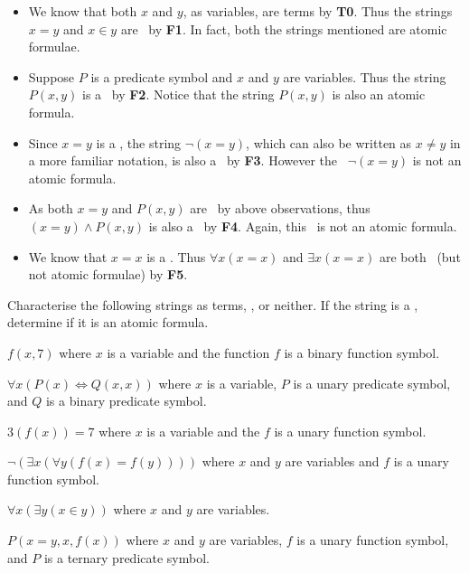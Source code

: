 \begin{example}
    \begin{itemize}[leftmargin=*]
        \item We know that both $x$ and $y$, as variables, are terms by \textbf{T0}. Thus the strings $x=y$ and $x \in y$ are \wffs~by \textbf{F1}. In fact, both the strings mentioned are atomic formulae.
        \item Suppose $P$ is a predicate symbol and $x$ and $y$ are variables. Thus the string $P(x,y)$ is a \wff~by \textbf{F2}. Notice that the string $P(x,y)$ is also an atomic formula.
        \item Since $x=y$ is a \wff, the string $\lnot(x=y)$, which can also be written as $x \neq y$ in a more familiar notation, is also a \wff~by \textbf{F3}. However the \wff~$\lnot(x=y)$ is not an atomic formula.
        \item As both $x=y$ and $P(x,y)$ are \wffs~by above observations, thus $(x=y)\land P(x,y)$ is also a \wff~by \textbf{F4}. Again, this \wff~is not an atomic formula.
        \item We know that $x=x$ is a \wff. Thus $\forall x(x=x)$ and $\exists x(x=x)$ are both \wffs~(but not atomic formulae) by \textbf{F5}.
    \end{itemize}
\end{example}

\begin{exercise}
    Characterise the following strings as terms, \wffs, or neither. If the string is a \wff, determine if it is an atomic formula.
    \begin{partquestions}{\alph*}
        \item $f(x,7)$ where $x$ is a variable and the function $f$ is a binary function symbol.
        \item $\forall x (P(x)\iff Q(x,x))$ where $x$ is a variable, $P$ is a unary predicate symbol, and $Q$ is a binary predicate symbol.
        \item $3(f(x))=7$ where $x$ is a variable and the $f$ is a unary function symbol.
        \item $\lnot (\exists x (\forall y (f(x) = f(y))))$ where $x$ and $y$ are variables and $f$ is a unary function symbol.
        \item $\forall x (\exists y (x \in y))$ where $x$ and $y$ are variables.
        \item $P(x=y,x,f(x))$ where $x$ and $y$ are variables, $f$ is a unary function symbol, and $P$ is a ternary predicate symbol.
    \end{partquestions}
\end{exercise}

